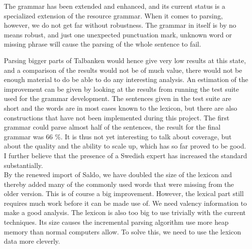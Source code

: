 \documentclass{report}
\begin{document}
The grammar has been extended and enhanced, and its current status is
a specialized extension of the resource grammar. When it comes to parsing,
however, we do not get far without robustness.
The grammar in itself is by no means robust, and just one 
unexpected punctuation mark, unknown word
or missing phrase will cause the parsing of the whole sentence to fail. 

Parsing bigger parts of Talbanken would hence give very low results at this state, 
and a comparison of the results would not be of much value,
there would not be enough material %
to do be able to do any interesting analysis.
An estimation of the improvement can be given by looking at the results from
running the test suite used for the grammar development.
The sentences given in the test suite are short and the words are in most cases known
to the lexicon, but there are also constructions that have not been implemented 
during this project.
The first grammar could parse almost half of the sentences, the result for the final
grammar was 66 \%. 
It is thus not yet interesting to talk about coverage, but about the quality and
the ability to scale up, which has so far proved to be good.
I further believe that the presence of a Swedish expert has
increased the standard substantially.\\


By the renewed import of Saldo, we have doubled the size of the lexicon and thereby
added many of the commonly used words that were missing from the older
version. This is of course a big improvement.
However, the lexical part still requires much work before it can be made use of.
We need valency information to make a good analysis. The lexicon is also too
big to use trivially with the current techniques. Its size causes the
incremental parsing algorithm use more heap memory than normal computers
allow. To solve this, we need to use the lexicon data more cleverly.

%
%
\end{document}
